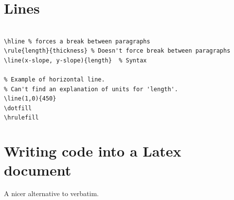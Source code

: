 \documentclass{article}
\begin{document}
\section{Lines}
\begin{lstlisting}

\hline % forces a break between paragraphs
\rule{length}{thickness} % Doesn't force break between paragraphs
\line(x-slope, y-slope){length}  % Syntax

% Example of horizontal line.
% Can't find an explanation of units for 'length'.
\line(1,0){450}
\dotfill
\hrulefill
\end{lstlisting}



\section{Writing code into a Latex document}
A nicer alternative to verbatim.
\end{document}
